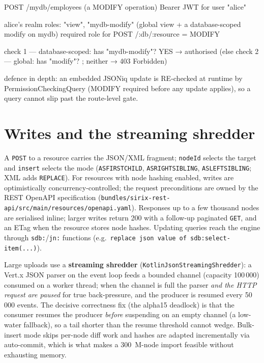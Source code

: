 \documentclass[11pt,a4paper,oneside]{report}
\newcommand{\dcap}[1]{\par\vspace{1pt}\noindent{\small\sffamily\bfseries\color{slate}#1}\par\vspace{-2pt}}
\theoremstyle{sirixthm}
\newcommand{\code}[1]{\texttt{#1}}
\begin{document}
\dcap{Two-tier role resolution for one request}
\begin{diagramS}
POST /mydb/employees   (a MODIFY operation)   Bearer JWT for user "alice"

  alice's realm roles: { "view", "mydb-modify" }       (global view + a database-scoped modify on mydb)
  required role for POST /:db/:resource = MODIFY

  check 1 — database-scoped:  has "mydb-modify"?  YES → authorised
  (else check 2 — global:     has "modify"?  ;  neither → 403 Forbidden)

  defence in depth: an embedded JSONiq update is RE-checked at runtime by PermissionCheckingQuery
  (MODIFY required before any update applies), so a query cannot slip past the route-level gate.
\end{diagramS}

\section{Writes and the streaming shredder}

A \code{POST} to a resource carries the JSON/XML fragment; \code{nodeId} selects the target and
\code{insert} selects the mode (\code{ASFIRSTCHILD}, \code{ASRIGHTSIBLING}, \code{ASLEFTSIBLING};
XML adds \code{REPLACE}). For resources with node hashing enabled, writes are optimistically
concurrency-controlled; the request preconditions are owned by the REST OpenAPI specification
(\code{bundles/sirix-rest-api/src/main/resources/openapi.yaml}). Responses up to a few thousand nodes
are serialised inline; larger writes return 200 with a follow-up paginated \code{GET}, and an ETag
when the resource stores node hashes. Updating queries reach the engine through
\code{sdb:}/\allowbreak\code{jn:} functions (e.g.\ \code{replace json value of sdb:select-item(...)}).

Large uploads use a \textbf{streaming shredder} (\code{KotlinJsonStreamingShredder}): a Vert.x JSON
parser on the event loop feeds a bounded channel (capacity 100\,000) consumed on a worker thread;
when the channel is full the parser \emph{and the HTTP request are paused} for true back-pressure,
and the producer is resumed every 50\,000 events. The decisive correctness fix (the alpha15
deadlock) is that the consumer resumes the producer \emph{before} suspending on an empty channel
(a low-water fallback), so a tail shorter than the resume threshold cannot wedge. Bulk-insert mode
skips per-node diff work and hashes are adapted incrementally via auto-commit, which is what makes a
300~M-node import feasible without exhausting memory.
\end{document}

